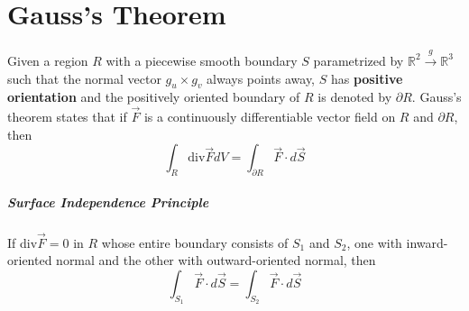 \documentclass[11pt]{article}
\begin{document}
\section{Gauss's Theorem}
	Given a region $R$ with a piecewise smooth boundary $S$ parametrized by $\mathbb{R}^2 \xrightarrow{g} \mathbb{R}^3$ such that the normal vector $g_u \times g_v$ always points away, $S$ has \textbf{positive orientation} and the positively oriented boundary of $R$ is denoted by $\partial R$. Gauss's theorem states that if $\vec{F}$ is a continuously differentiable vector field on $R$ and $\partial R$, then
	\begin{equation}
		\int_R \text{div} \vec{F} dV = \int_{\partial R} \vec{F} \cdot d\vec{S}
	\end{equation}
	
	\subparagraph{Surface Independence Principle} If div$\vec{F} = 0$ in $R$ whose entire boundary consists of $S_1$ and $S_2$, one with inward-oriented normal and the other with outward-oriented normal, then
		\begin{equation}
			\int_{S_1} \vec{F} \cdot d\vec{S} = \int_{S_2} \vec{F} \cdot d\vec{S}
		\end{equation}
%		
%		


\end{document}
